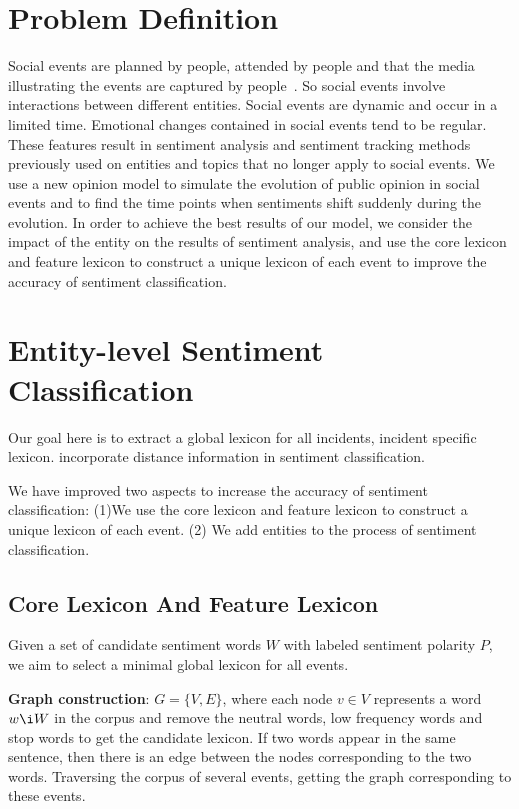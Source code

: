 \documentclass[runningheads]{llncs}
\begin{document}
\section{Problem Definition}\label{sec:problem definition}
Social events are planned by people, attended by people and that the media illustrating the events are captured by people~\cite{Papadopoulos2012SocialEvent}. So social events involve interactions between different entities. Social events are dynamic and occur in a limited time. Emotional changes contained in social events tend to be regular. These features result in sentiment analysis and sentiment tracking methods previously used on entities and topics that no longer apply to social events. We use a new opinion model to simulate the evolution of public opinion in social events and to find the time points when sentiments shift suddenly during the evolution. In order to achieve the best results of our model, we consider the impact of the entity on the results of sentiment analysis, and use the core lexicon and feature lexicon to construct a unique lexicon of each event to improve the accuracy of sentiment classification.



\section{Entity-level Sentiment Classification}\label{sec:sentiment classification}
Our goal here %
is to extract a global lexicon for all incidents, incident specific lexicon. %
incorporate distance information in sentiment classification. 

We have improved two aspects to increase the accuracy of sentiment classification:  (1)We use the core lexicon and feature lexicon to construct a unique lexicon of each event. (2) We add entities to the process of sentiment classification.
\subsection{Core Lexicon And Feature Lexicon}
Given a set of candidate sentiment words $W$ with labeled sentiment polarity $P$, we aim to select a minimal global lexicon for all events.  

\textbf{Graph construction}:  $G=\{V,E\}$, where each node $v\in V$ represents a word $w\i W$ in the corpus and remove the neutral words, low frequency words and stop words to get the candidate lexicon.  If two words appear in the same sentence, then there is an edge between the nodes corresponding to the two words. Traversing the corpus of several events, getting the graph corresponding to these events. 
\end{document}
